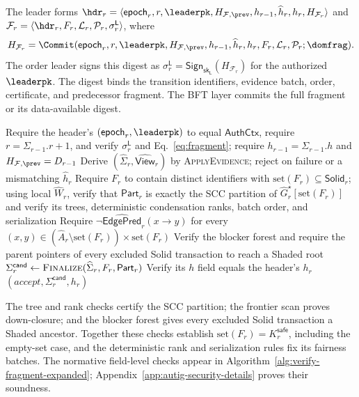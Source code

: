 The leader forms
$\hdr_r=\langle\mathsf{epoch}_r,r,\leaderpk,H_{\mathcal F,\prev},
h_{r-1},\widehat h_r,h_r,H_{\mathcal F_r}\rangle$ and
$\mathcal F_r=\langle\hdr_r,F_r,\mathcal L_r,\mathcal P_r,
\sigma_r^{\mathsf L}\rangle$, where
\begin{equation}
 H_{\mathcal F_r}=\Commit(\mathsf{epoch}_r,r,\leaderpk,
 H_{\mathcal F,\prev},h_{r-1},\widehat h_r,h_r,
 F_r,\mathcal L_r,\mathcal P_r;\domfrag).
 \label{eq:fragment}
\end{equation}
The order leader signs this digest as $\sigma_r^{\mathsf L}
=\mathsf{Sign}_{\mathsf{sk}_{\mathsf L}}(H_{\mathcal F_r})$ for the authorized
$\leaderpk$.  The digest binds the transition identifiers, evidence batch,
order, certificate, and predecessor fragment.  The BFT layer commits the full
fragment or its data-available digest.

\begin{algorithm}[h!]
\caption{\textsc{VerifyFragment}: Verify a Proof-Carrying Fragment}
\label{alg:verify-fragment}
\footnotesize
{}
Require the header's $(\mathsf{epoch}_r,\leaderpk)$ to equal
$\mathsf{AuthCtx}$, require $r=\Sigma_{r-1}.r+1$, and verify
$\sigma_r^{\mathsf L}$ and
Eq.~\eqref{eq:fragment}; require
$h_{r-1}=\Sigma_{r-1}.h$ and $H_{\mathcal F,\prev}=D_{r-1}$\;
Derive $(\widehat\Sigma_r,\widehat{\mathsf{View}}_r)$ by
\textsc{ApplyEvidence}; reject on failure or a mismatching $\widehat h_r$\;
Require $F_r$ to contain distinct identifiers with
$\mathrm{set}(F_r)\subseteq\mathsf{Solid}_r$; using local $\widehat W_r$,
verify that $\mathsf{Part}_r$ is exactly the SCC partition of
$\widehat G_r^\star[\mathrm{set}(F_r)]$ and verify its trees, deterministic
condensation ranks, batch order, and serialization\;
Require $\neg\widehat{\mathsf{EdgePred}}_r(x\to y)$ for every
$(x,y)\in(\widehat A_r\setminus\mathrm{set}(F_r))
\times\mathrm{set}(F_r)$\;
Verify the blocker forest and require the parent pointers of every
excluded Solid transaction to reach a Shaded root\;
$\Sigma_r^{\mathsf{cand}}\gets
  \textsc{Finalize}(\widehat\Sigma_r,F_r,\mathsf{Part}_r)$\;
Verify its $h$ field equals the header's $h_r$\;
\KwRet $(accept,\Sigma_r^{\mathsf{cand}},h_r)$
\end{algorithm}

The tree and rank checks certify the SCC partition; the frontier scan proves
down-closure; and the blocker forest gives every excluded Solid transaction a
Shaded ancestor.  Together these checks establish
$\mathrm{set}(F_r)=K_r^{\mathsf{safe}}$, including the empty-set case, and the
deterministic rank and serialization rules fix its fairness batches.  The
normative field-level checks appear in
Algorithm~\ref{alg:verify-fragment-expanded}; Appendix~\ref{app:autig-security-details}
proves their soundness.

